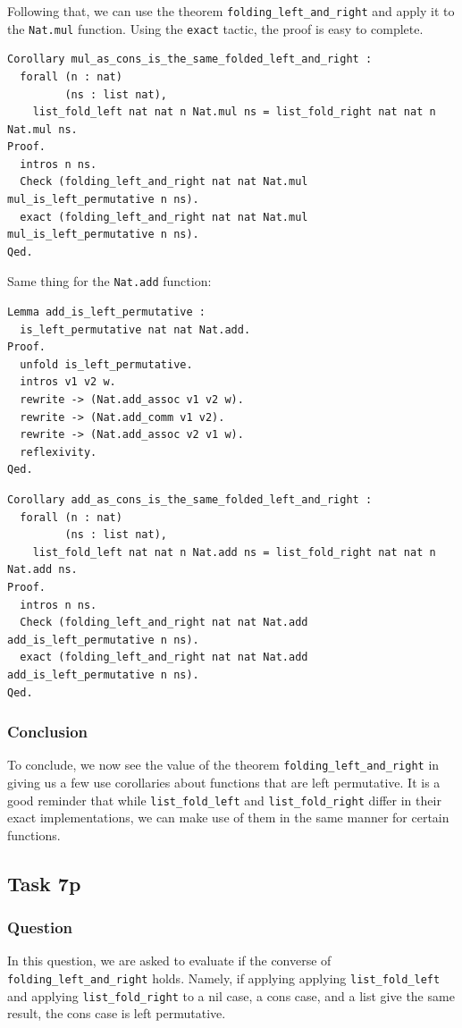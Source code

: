 \documentclass{article}
\begin{document}
Following that, we can use the theorem \texttt{folding\_left\_and\_right} and apply it to the \texttt{Nat.mul} function. Using the \texttt{exact} tactic, the proof is easy to complete.

\begin{lstlisting}
Corollary mul_as_cons_is_the_same_folded_left_and_right :
  forall (n : nat)
         (ns : list nat),
    list_fold_left nat nat n Nat.mul ns = list_fold_right nat nat n Nat.mul ns.
Proof.
  intros n ns.
  Check (folding_left_and_right nat nat Nat.mul mul_is_left_permutative n ns).
  exact (folding_left_and_right nat nat Nat.mul mul_is_left_permutative n ns).
Qed.
\end{lstlisting}

Same thing for the \texttt{Nat.add} function:

\begin{lstlisting}
Lemma add_is_left_permutative :
  is_left_permutative nat nat Nat.add.
Proof.
  unfold is_left_permutative.
  intros v1 v2 w.
  rewrite -> (Nat.add_assoc v1 v2 w).
  rewrite -> (Nat.add_comm v1 v2).
  rewrite -> (Nat.add_assoc v2 v1 w).
  reflexivity.
Qed.
\end{lstlisting}

\begin{lstlisting}
Corollary add_as_cons_is_the_same_folded_left_and_right :
  forall (n : nat)
         (ns : list nat),
    list_fold_left nat nat n Nat.add ns = list_fold_right nat nat n Nat.add ns.
Proof.
  intros n ns.
  Check (folding_left_and_right nat nat Nat.add add_is_left_permutative n ns).
  exact (folding_left_and_right nat nat Nat.add add_is_left_permutative n ns).
Qed.
\end{lstlisting}

\subsubsection{Conclusion}
To conclude, we now see the value of the theorem \texttt{folding\_left\_and\_right} in giving us a few use corollaries about functions that are left permutative. It is a good reminder that while \texttt{list\_fold\_left} and \texttt{list\_fold\_right} differ in their exact implementations, we can make use of them in the same manner for certain functions. 

\subsection{Task 7p}

\subsubsection{Question}
In this question, we are asked to evaluate if the converse of \texttt{folding\_left\_and\_right} holds. Namely, if applying applying \texttt{list\_fold\_left} and applying \texttt{list\_fold\_right} to a nil case, a cons case, and a list give the same result, the cons case is left permutative.
\end{document}
